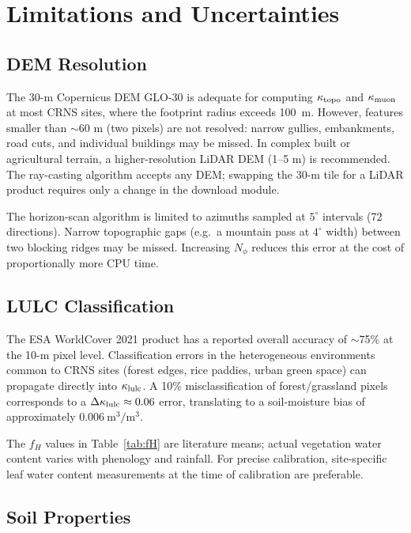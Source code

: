 \section{Limitations and Uncertainties}
\label{sec:limits}

\subsection{DEM Resolution}

The 30-m Copernicus DEM GLO-30 is adequate for computing $\kappa_\mathrm{topo}$ and
$\kappa_\mathrm{muon}$ at most CRNS sites, where the footprint radius exceeds
\SI{100}{m}.
However, features smaller than $\sim$60 m (two pixels) are not
resolved: narrow gullies, embankments, road cuts, and individual
buildings may be missed.
In complex built or agricultural terrain, a higher-resolution LiDAR
DEM (1–5 m) is recommended.
The ray-casting algorithm accepts any DEM; swapping the 30-m tile
for a LiDAR product requires only a change in the download module.

The horizon-scan algorithm is limited to azimuths sampled at $5^\circ$
intervals (72 directions).
Narrow topographic gaps (e.g.\ a mountain pass at $4^\circ$ width)
between two blocking ridges may be missed.
Increasing $N_\phi$ reduces this error at the cost of proportionally
more CPU time.

\subsection{LULC Classification}

The ESA WorldCover 2021 product has a reported overall accuracy of
$\sim$75\% at the 10-m pixel level.
Classification errors in the heterogeneous environments common to
CRNS sites (forest edges, rice paddies, urban green space) can
propagate directly into $\kappa_\mathrm{lulc}$.
A 10\% misclassification of forest/grassland pixels corresponds to a
$\Delta\kappa_\mathrm{lulc} \approx 0.06$ error, translating to a soil-moisture bias
of approximately $\SI{0.006}{\cubic\metre\per\cubic\metre}$.

The $f_H$ values in Table~\ref{tab:fH} are literature means;
actual vegetation water content varies with phenology and rainfall.
For precise calibration, site-specific leaf water content measurements
at the time of calibration are preferable.

\subsection{Soil Properties}


